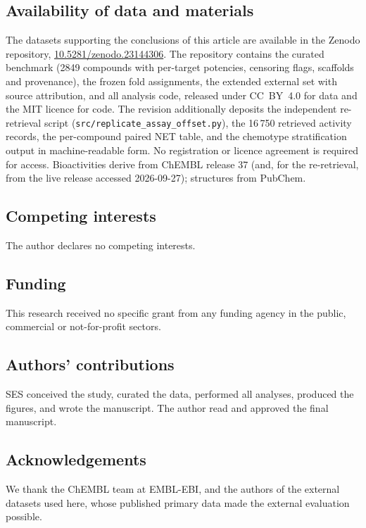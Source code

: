 \documentclass[11pt,a4paper]{article}
\begin{document}
\subsection*{Availability of data and materials}
The datasets supporting the conclusions of this article are available in the Zenodo
repository, \mbox{\href{https://doi.org/10.5281/zenodo.23144306}{10.5281/zenodo.23144306}}.
The repository contains the curated benchmark
(2849 compounds with per-target potencies, censoring flags, scaffolds and
provenance), the frozen fold assignments, the extended external set with source
attribution, and all analysis code, released under CC~BY~4.0 for data and the MIT
licence for code. The revision additionally deposits the independent re-retrieval
script (\texttt{src/replicate\_assay\_offset.py}), the 16\,750 retrieved activity
records, the per-compound paired NET table, and the chemotype stratification output
in machine-readable form. No registration or licence agreement is required for
access. Bioactivities derive from ChEMBL release 37 (and, for the re-retrieval, from
the live release accessed 2026-09-27); structures from PubChem.

\subsection*{Competing interests}
The author declares no competing interests.

\subsection*{Funding}
This research received no specific grant from any funding agency in the public,
commercial or not-for-profit sectors.

\subsection*{Authors' contributions}
SES conceived the study, curated the data, performed all analyses, produced the
figures, and wrote the manuscript. The author read and approved the final manuscript.

\subsection*{Acknowledgements}
We thank the ChEMBL team at EMBL-EBI, and the authors of the external datasets used
here, whose published primary data made the external evaluation possible.
\end{document}

